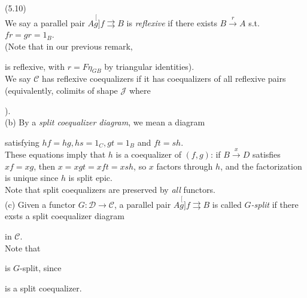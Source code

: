 \documentclass[a4paper]{article}
\begin{document}
\begin{defi} (5.10)\\
    We say a parallel pair $A \stackrel[g]{f}{\rightrightarrows} B$ is \emph{reflexive} if there exists $B \xrightarrow{r} A$ s.t. $fr = gr = 1_B$.\\
    (Note that in our previous remark,
    is reflexive, with $r = F\eta_{GB}$ by triangular identities).\\
    We say $\mathcal{C}$ has reflexive coequalizers if it has coequalizers of all reflexive pairs (equivalently, colimits of shape $\mathcal{J}$ where
    ).\\
    (b) By a \emph{split coequalizer diagram}, we mean a diagram
    satisfying $hf=hg,hs=1_C,gt=1_B$ and $ft = sh$.\\
    These equations imply that $h$ is a coequalizer of $(f,g)$: if $B \xrightarrow{x} D$ satisfies $xf = xg$, then $x=xgt=xft=xsh$, so $x$ factors through $h$, and the factorization is unique since $h$ is split epic.\\
    Note that split coequalizers are preserved by \emph{all} functors.\\
    (c) Given a functor $G:\mathcal{D} \to \mathcal{C}$, a parallel pair $A \stackrel[g]{f}{\rightrightarrows} B$ is called \emph{$G$-split} if there exsts a split coequalizer diagram
    in $\mathcal{C}$.\\
    Note that 
    is $G$-split, since 
    is a split coequalizer.
\end{defi}
\end{document}
